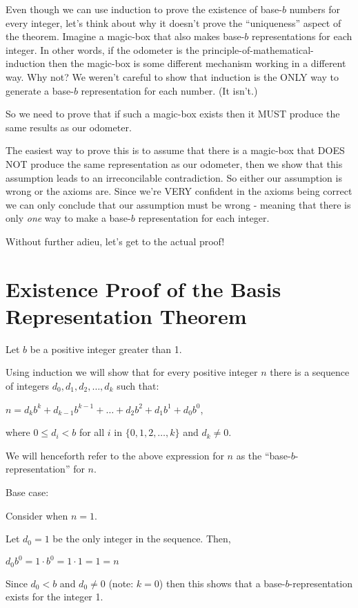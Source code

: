\documentclass{article}
\newenvironment{jprIn}{\begin{adjustwidth}{2em}{}}{\end{adjustwidth}}
\begin{document}
\bigskip
Even though we can use induction to prove the existence of base-$b$
numbers for every integer, let's think about why it
doesn't prove the ``uniqueness'' aspect of 
the theorem.
Imagine a magic-box
that also makes base-$b$ representations for each
integer.
In other words, if the odometer is the principle-of-mathematical-induction then the magic-box
is some different mechanism working in a different way.
Why not? We weren't careful to show that induction is the ONLY way
to generate a base-$b$ representation for each number. (It isn't.)

So we need to prove that if such a magic-box exists then it MUST
produce the same results as our odometer.

The easiest way to prove this is to assume that there is a magic-box
that DOES NOT produce the same representation as our odometer, then we show that
this assumption leads to an irreconcilable contradiction.
So either our assumption is wrong or the axioms are.
Since we're VERY confident in the axioms being correct we can only 
conclude that our assumption must be wrong - meaning
that there is only \emph{one} way 
to make a base-$b$ representation for each integer.

Without further adieu, let's get to the actual proof!

\section*{Existence Proof of the Basis Representation Theorem}
Let $b$ be a positive integer greater than 1.

Using induction we will show that for every positive integer $n$ there is a sequence
of integers $d_0, d_1, d_2,\dots{},d_k$ such that:

\hspace{3em}$n=d_kb^k+d_{k-1}b^{k-1}+\dots+d_2b^2+d_1b^1+d_0b^0$,

where $0\le{}d_i<b$ for all $i$ in $\{0,1,2,\dots{},k\}$ and $d_k\ne0$.

We will henceforth refer to the above expression for $n$ as the
``base-$b$-representation'' for $n$.

\bigskip
Base case:
\begin{jprIn}
Consider when $n=1$.

Let $d_0=1$ be the only integer in the sequence.  Then,

\hspace{3em}$d_0b^0=1\cdot{}b^0=1\cdot{}1=1=n$

Since $d_0<b$ and $d_0\ne0$ (note: $k=0$) then this
shows that a 
base-$b$-representation exists for the integer 1.
\end{jprIn}
\end{document}

